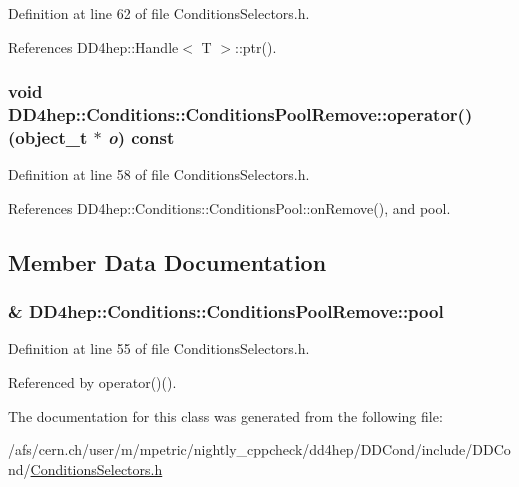 Definition at line 62 of file ConditionsSelectors.h.

References DD4hep::Handle$<$ T $>$::ptr().\hypertarget{class_d_d4hep_1_1_conditions_1_1_conditions_pool_remove_ae57cebd122ce28cedf297c530a7795b3}{
\subsubsection[{operator()}]{\setlength{\rightskip}{0pt plus 5cm}void DD4hep::Conditions::ConditionsPoolRemove::operator() ({\bf object\_\-t} $\ast$ {\em o}) const}}
\label{class_d_d4hep_1_1_conditions_1_1_conditions_pool_remove_ae57cebd122ce28cedf297c530a7795b3}


Definition at line 58 of file ConditionsSelectors.h.

References DD4hep::Conditions::ConditionsPool::onRemove(), and pool.

\subsection{Member Data Documentation}
\hypertarget{class_d_d4hep_1_1_conditions_1_1_conditions_pool_remove_a8db5c24da51ce1a590146387c3ab0c3b}{
\subsubsection[{pool}]{\& {\bf DD4hep::Conditions::ConditionsPoolRemove::pool}}}
\label{class_d_d4hep_1_1_conditions_1_1_conditions_pool_remove_a8db5c24da51ce1a590146387c3ab0c3b}


Definition at line 55 of file ConditionsSelectors.h.

Referenced by operator()().

The documentation for this class was generated from the following file:\begin{DoxyCompactItemize}
\item 
/afs/cern.ch/user/m/mpetric/nightly\_\-cppcheck/dd4hep/DDCond/include/DDCond/\hyperlink{_conditions_selectors_8h}{ConditionsSelectors.h}\end{DoxyCompactItemize}
